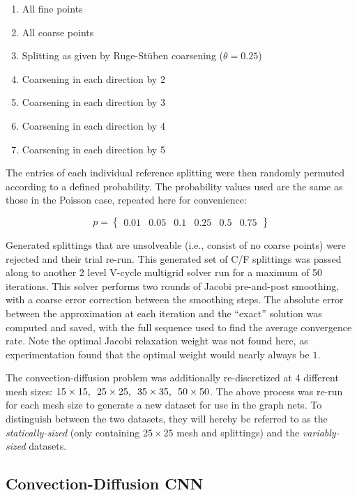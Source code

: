 \documentclass[review]{siamart190516}
\begin{document}
\begin{enumerate}
\item All fine points
\item All coarse points
\item Splitting as given by Ruge-St\"{u}ben coarsening ($\theta=0.25$)
\item Coarsening in each direction by 2
\item Coarsening in each direction by 3
\item Coarsening in each direction by 4
\item Coarsening in each direction by 5
\end{enumerate}

The entries of each individual reference splitting were then randomly permuted according to a defined probability.  The probability values used are the same as those in the Poisson case, repeated here for convenience:

\begin{equation} \label{eqn:conv_probabilities}
  p = \begin{Bmatrix} 0.01 & 0.05 & 0.1 & 0.25 & 0.5 & 0.75 \end{Bmatrix}
\end{equation}

Generated splittings that are unsolveable (i.e., consist of no coarse points) were rejected and their trial re-run.  This generated set of C/F splittings was passed along to another 2 level V-cycle multigrid solver run for a maximum of 50 iterations.  This solver performs two rounds of Jacobi pre-and-post smoothing, with a coarse error correction between the smoothing steps.  The absolute error between the approximation at each iteration and the ``exact'' solution was computed and saved, with the full sequence used to find the average convergence rate.  Note the optimal Jacobi relaxation weight was not found here, as experimentation found that the optimal weight would nearly always be $1$.

The convection-diffusion problem was additionally re-discretized at 4 different mesh sizes: $15\times 15,\enskip 25\times 25,\enskip 35\times 35,\enskip 50\times 50$.  The above process was re-run for each mesh size to generate a new dataset for use in the graph nets.  To distinguish between the two datasets, they will hereby be referred to as the \textit{statically-sized} (only containing $25 \times 25$ mesh and splittings) and the \textit{variably-sized} datasets.

\subsection{Convection-Diffusion CNN}\label{subsec:conv_cnn}
\end{document}
